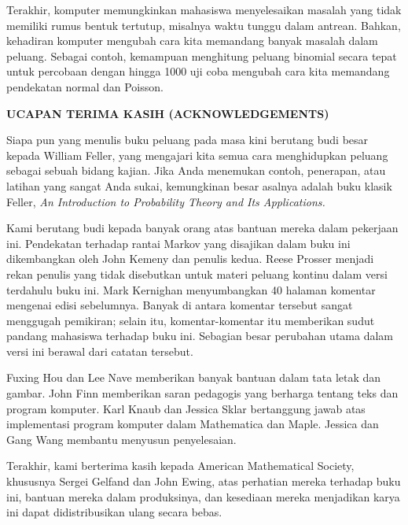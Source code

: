 Terakhir, komputer memungkinkan mahasiswa menyelesaikan masalah yang tidak
memiliki rumus bentuk tertutup, misalnya waktu tunggu dalam antrean. Bahkan,
kehadiran komputer mengubah cara kita memandang banyak masalah dalam peluang.
Sebagai contoh, kemampuan menghitung peluang binomial secara tepat untuk
percobaan dengan hingga 1000 uji coba mengubah cara kita memandang pendekatan
normal dan Poisson.

\bigskip\centerline{\bf UCAPAN TERIMA KASIH (ACKNOWLEDGEMENTS)}\medskip

Siapa pun yang menulis buku peluang pada masa kini berutang budi besar kepada
William Feller, yang mengajari kita semua cara menghidupkan peluang sebagai
sebuah bidang kajian. Jika Anda menemukan contoh, penerapan, atau latihan yang
sangat Anda sukai, kemungkinan besar asalnya adalah buku klasik Feller,
{\sl An Introduction to Probability Theory and Its Applications.}

Kami berutang budi kepada banyak orang atas bantuan mereka dalam pekerjaan
ini. Pendekatan terhadap rantai Markov yang disajikan dalam buku ini
dikembangkan oleh John Kemeny dan penulis kedua. Reese Prosser menjadi rekan
penulis yang tidak disebutkan untuk materi peluang kontinu dalam versi
terdahulu buku ini. Mark Kernighan menyumbangkan 40 halaman komentar mengenai
edisi sebelumnya. Banyak di antara komentar tersebut sangat menggugah
pemikiran; selain itu, komentar-komentar itu memberikan sudut pandang mahasiswa
terhadap buku ini. Sebagian besar perubahan utama dalam versi ini berawal dari
catatan tersebut.

Fuxing Hou dan Lee Nave memberikan banyak bantuan dalam tata letak dan gambar.
John Finn memberikan saran pedagogis yang berharga tentang teks dan program
komputer. Karl Knaub dan Jessica Sklar bertanggung jawab atas implementasi
program komputer dalam Mathematica dan Maple. Jessica dan Gang Wang membantu
menyusun penyelesaian.

Terakhir, kami berterima kasih kepada American Mathematical Society, khususnya
Sergei Gelfand dan John Ewing, atas perhatian mereka terhadap buku ini, bantuan
mereka dalam produksinya, dan kesediaan mereka menjadikan karya ini dapat
didistribusikan ulang secara bebas.
